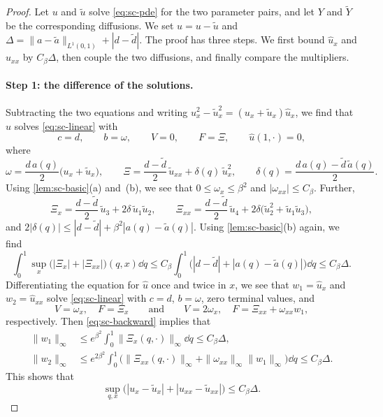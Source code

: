 \begin{proof}
Let $u$ and $\widetilde u$ solve \eqref{eq:sc-pde} for the two
parameter pairs, and let $Y$ and $\widetilde Y$ be the corresponding
diffusions. We set $\hat u=u-\widetilde u$ and
$\Delta=\|a-\widetilde a\|_{L^1(0,1)}+|d-\widetilde d|$. The proof has
three steps. We first bound $\hat u_x$ and $\hat u_{xx}$ by
$C_\beta\Delta$, then couple the two diffusions, and finally compare
the multipliers.

\paragraph{Step 1: the difference of the solutions.}
Subtracting the two equations and writing
$u_x^2-\widetilde u_x^2=(u_x+\widetilde u_x)\hat u_x$, we find that
$\hat u$ solves \eqref{eq:sc-linear} with
\[
 c=d,\qquad b=\omega,\qquad V=0,\qquad F=\Xi,\qquad
 \hat u(1,\cdot)=0,
\]
where
\[
 \omega=\frac{d\,a(q)}2\bigl(u_x+\widetilde u_x\bigr),\qquad
 \Xi=\frac{d-\widetilde d}2\,\widetilde u_{xx}
     +\delta(q)\,\widetilde u_x^2,\qquad
 \delta(q)=\frac{d\,a(q)-\widetilde d\,\widetilde a(q)}2 .
\]
Using \cref{lem:sc-basic}(a) and~(b), we see that $0\le\omega_x\le\beta^2$ and
$|\omega_{xx}|\le C_\beta$. Further,
\[
 \Xi_x=\frac{d-\widetilde d}2\,\widetilde u_3
       +2\delta\,\widetilde u_1\widetilde u_2,\qquad
 \Xi_{xx}=\frac{d-\widetilde d}2\,\widetilde u_4
       +2\delta\bigl(\widetilde u_2^2+\widetilde u_1\widetilde u_3\bigr),
\]
and $2|\delta(q)|\le|d-\widetilde d|+\beta^2|a(q)-\widetilde a(q)|$.
Using \cref{lem:sc-basic}(b) again, we find
\[
 \int_0^1\sup_x\bigl(|\Xi_x|+|\Xi_{xx}|\bigr)(q,x)\dd q
 \le C_\beta\int_0^1\bigl(|d-\widetilde d|+|a(q)-\widetilde a(q)|\bigr)\dd q
 \le C_\beta\Delta .
\]
Differentiating the equation for $\hat u$ once and twice in $x$, we see
that $w_1=\hat u_x$ and $w_2=\hat u_{xx}$ solve \eqref{eq:sc-linear}
with $c=d$, $b=\omega$, zero terminal values, and
\[
 V=\omega_x,\quad F=\Xi_x\qquad\text{and}\qquad
 V=2\omega_x,\quad F=\Xi_{xx}+\omega_{xx}w_1,
\]
respectively. Then \eqref{eq:sc-backward} implies that
\[
 \begin{aligned}
 \|w_1\|_\infty&\le e^{\beta^2}\int_0^1\|\Xi_x(q,\cdot)\|_\infty\dd q
 \le C_\beta\Delta,\\
 \|w_2\|_\infty&\le e^{2\beta^2}\int_0^1\bigl(\|\Xi_{xx}(q,\cdot)\|_\infty
 +\|\omega_{xx}\|_\infty\|w_1\|_\infty\bigr)\dd q\le C_\beta\Delta .
 \end{aligned}
\]
This shows that
\begin{equation}\label{eq:sc-pde-distance}
 \sup_{q,x}\bigl(|u_x-\widetilde u_x|+|u_{xx}-\widetilde u_{xx}|\bigr)
 \le C_\beta\Delta .
\end{equation}


\end{proof}

